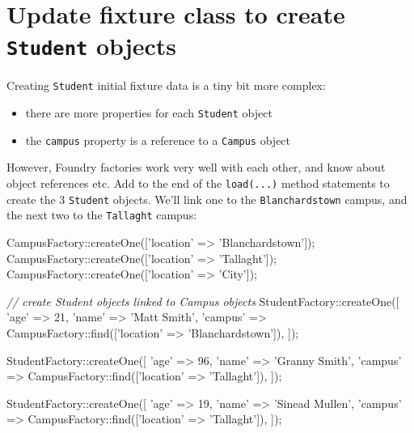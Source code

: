 \documentclass[a4paperpaper,openright]{book}
\newenvironment{Shaded}{}{}
\newcommand{\CommentTok}[1]{\textcolor[rgb]{0.38,0.63,0.69}{\textit{#1}}}
\newcommand{\DecValTok}[1]{\textcolor[rgb]{0.25,0.63,0.44}{#1}}
\newcommand{\NormalTok}[1]{#1}
\newcommand{\OtherTok}[1]{\textcolor[rgb]{0.00,0.44,0.13}{#1}}
\newcommand{\StringTok}[1]{\textcolor[rgb]{0.25,0.44,0.63}{#1}}
\providecommand{\tightlist}{%
  \setlength{\itemsep}{0pt}\setlength{\parskip}{0pt}}
\begin{document}
\hypertarget{update-fixture-class-to-create-student-objects}{%
\section{\texorpdfstring{Update fixture class to create \texttt{Student}
objects}{Update fixture class to create Student objects}}\label{update-fixture-class-to-create-student-objects}}

Creating \texttt{Student} initial fixture data is a tiny bit more
complex:

\begin{itemize}
\tightlist
\item
  there are more properties for each \texttt{Student} object
\item
  the \texttt{campus} property is a reference to a \texttt{Campus}
  object
\end{itemize}

However, Foundry factories work very well with each other, and know
about object references etc. Add to the end of the \texttt{load(...)}
method statements to create the 3 \texttt{Student} objects. We'll link
one to the \texttt{Blanchardstown} campus, and the next two to the
\texttt{Tallaght} campus:

\begin{Shaded}
\begin{Highlighting}[]
\NormalTok{        CampusFactory::createOne}\OtherTok{([}\StringTok{'location'}\NormalTok{ => }\StringTok{'Blanchardstown'}\OtherTok{]);}
\NormalTok{        CampusFactory::createOne}\OtherTok{([}\StringTok{'location'}\NormalTok{ => }\StringTok{'Tallaght'}\OtherTok{]);}
\NormalTok{        CampusFactory::createOne}\OtherTok{([}\StringTok{'location'}\NormalTok{ => }\StringTok{'City'}\OtherTok{]);}

        \CommentTok{// create Student objects linked to Campus objects}
\NormalTok{        StudentFactory::createOne}\OtherTok{([}
            \StringTok{'age'}\NormalTok{ => }\DecValTok{21}\OtherTok{,}
            \StringTok{'name'}\NormalTok{ => }\StringTok{'Matt Smith'}\OtherTok{,}
            \StringTok{'campus'}\NormalTok{ => CampusFactory::find}\OtherTok{([}\StringTok{'location'}\NormalTok{ => }\StringTok{'Blanchardstown'}\OtherTok{]),}
        \OtherTok{]);}

\NormalTok{        StudentFactory::createOne}\OtherTok{([}
            \StringTok{'age'}\NormalTok{ => }\DecValTok{96}\OtherTok{,}
            \StringTok{'name'}\NormalTok{ => }\StringTok{'Granny Smith'}\OtherTok{,}
            \StringTok{'campus'}\NormalTok{ => CampusFactory::find}\OtherTok{([}\StringTok{'location'}\NormalTok{ => }\StringTok{'Tallaght'}\OtherTok{]),}
        \OtherTok{]);}

\NormalTok{        StudentFactory::createOne}\OtherTok{([}
            \StringTok{'age'}\NormalTok{ => }\DecValTok{19}\OtherTok{,}
            \StringTok{'name'}\NormalTok{ => }\StringTok{'Sinead Mullen'}\OtherTok{,}
            \StringTok{'campus'}\NormalTok{ => CampusFactory::find}\OtherTok{([}\StringTok{'location'}\NormalTok{ => }\StringTok{'Tallaght'}\OtherTok{]),}
        \OtherTok{]);}
\end{Highlighting}
\end{Shaded}
\end{document}
